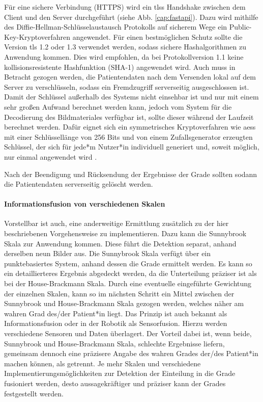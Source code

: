 Für eine sichere Verbindung (HTTPS) wird ein \Acp{tls} Handshake zwischen dem Client und den Server durchgeführt (siehe Abb. \ref{cap:fastapi}). Dazu wird mithilfe des Diffie-Hellman-Schlüsselaustausch Protokolls auf sicherem Wege ein Public-Key-Kryptoverfahren angewendet. Für einen bestmöglichen Schutz sollte die Version \ac{tls} 1.2 oder 1.3 verwendet werden, sodass sichere Hashalgorithmen zu Anwendung kommen. Dies wird empfohlen, da bei Protokollversion 1.1 keine kollisionsresistente Hashfunktion (SHA-1) angewendet wird. Auch muss in Betracht gezogen werden, die Patientendaten nach dem Versenden lokal auf dem Server zu verschlüsseln, sodass ein Fremdzugriff serverseitig ausgeschlossen ist. Damit der Schlüssel außerhalb des Systems nicht einsehbar ist und nur mit einem sehr großen Aufwand berechnet werden kann, jedoch vom System für die Decodierung des Bildmateriales verfügbar ist, sollte dieser während der Laufzeit berechnet werden. Dafür eignet sich ein symmetrisches Kryptoverfahren wie \Acp{aes} mit einer Schlüssellänge von 256 Bits und von einem Zufallsgenerator erzeugten Schlüssel, der sich für jede*m Nutzer*in individuell generiert und, soweit möglich, nur einmal angewendet wird \cite{bsi}.

Nach der Beendigung und Rücksendung der Ergebnisse der Grade sollten sodann die
Patientendaten serverseitig gelöscht werden.

\clearpage
\paragraph{Informationsfusion von verschiedenen Skalen}
Vorstellbar ist auch, eine anderweitige Ermittlung zusätzlich zu der hier beschriebenen Vorgehensweise zu implementieren. Dazu kann die Sunnybrook Skala zur Anwendung kommen. Diese führt die Detektion separat, anhand derselben neun Bilder aus. Die Sunnybrook Skala verfügt über ein punktebasiertes System, anhand dessen die Grade ermittelt werden. Es kann so ein detaillierteres Ergebnis abgedeckt werden, da die Unterteilung präziser ist als bei der House-Brackmann Skala. Durch eine eventuelle eingeführte Gewichtung der einzelnen Skalen, kann so im nächsten Schritt ein Mittel zwischen der Sunnybrook und House-Brackmann Skala gezogen werden, welches näher am wahren Grad des/der Patient*in liegt. Das Prinzip ist auch bekannt als Informationsfusion oder in der Robotik als Sensorfusion. Hierzu werden verschiedene Sensoren und Daten überlagert. Der Vorteil dabei ist, wenn beide, Sunnybrook und House-Brackmann Skala, schlechte Ergebnisse liefern, gemeinsam dennoch eine präzisere Angabe des wahren Grades der/des Patient*in machen können, als getrennt. Je mehr Skalen und verschiedene Implementierungsmöglichkeiten zur Detektion der Einteilung in die Grade fusioniert werden, desto aussagekräftiger und präziser kann der Grades festgestellt werden.

